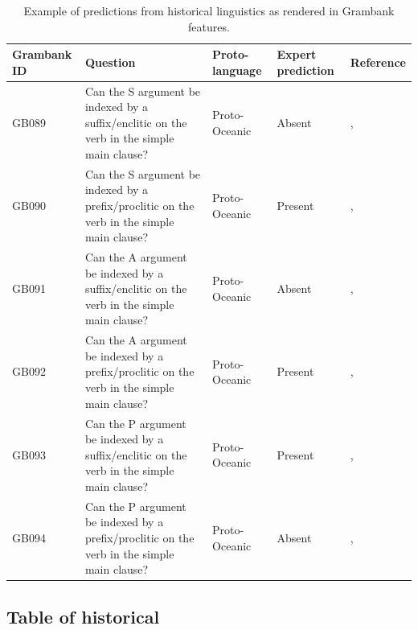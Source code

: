 \documentclass[draft,10pt]{article} %
\begin{document}
\begin{table}[H] %
\centering
\caption{Example of predictions from historical linguistics as rendered in Grambank features.}
\label{example_HL_prediction_table}
\begin{tabular}{|l| p{3cm}|  p{3cm}| p{3cm} | p{3cm} |}
\hline
\textbf{Grambank ID} & \textbf{Question} & \textbf{Proto-language} & \textbf{Expert prediction}& \textbf{Reference} \\ \hline
GB089  &Can the S argument be indexed by a suffix/enclitic on the verb in the simple main clause? &Proto-Oceanic &Absent & \citet[498-499]{ross2004morphosyntactic}, \citet[83]{lynchrosscrowley_proto_grammar_oceanic} \\ \hline
GB090 &Can the S argument be indexed by a prefix/proclitic on the verb in the simple main clause? &Proto-Oceanic &Present &\citet[498-499]{ross2004morphosyntactic}, \citet[83]{lynchrosscrowley_proto_grammar_oceanic}  \\ \hline
GB091 &Can the A argument be indexed by a suffix/enclitic on the verb in the simple main clause? &Proto-Oceanic &Absent &\citet[498-499]{ross2004morphosyntactic}, \citet[83]{lynchrosscrowley_proto_grammar_oceanic} \\ \hline
GB092  &Can the A argument be indexed by a prefix/proclitic on the verb in the simple main clause? &Proto-Oceanic &Present &\citet[498-499]{ross2004morphosyntactic}, \citet[83]{lynchrosscrowley_proto_grammar_oceanic}  \\ \hline
GB093  &Can the P argument be indexed by a suffix/enclitic on the verb in the simple main clause? &Proto-Oceanic &Present &\citet[498-499]{ross2004morphosyntactic}, \citet[83]{lynchrosscrowley_proto_grammar_oceanic} \\ \hline
GB094  &Can the P argument be indexed by a prefix/proclitic on the verb in the simple main clause? &Proto-Oceanic &Absent & \citet[498-499]{ross2004morphosyntactic}, \citet[83]{lynchrosscrowley_proto_grammar_oceanic} \\ \hline
\end{tabular}
\end{table}

\subsection{Table of historical}
\label{supp:proto_lg_coding_table}
\end{document}

